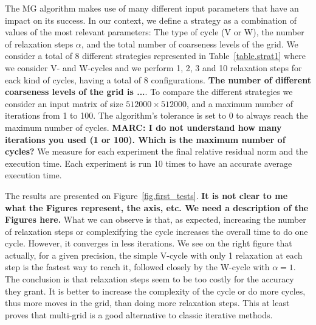 The MG algorithm makes use of many different input parameters that have an impact on its success. 
In our context, we define a strategy as a combination of values of the most relevant parameters: The type of cycle (V or W), the number of relaxation steps $\alpha$, and the total number of coarseness levels of the grid. 
We consider a total of 8 different strategies represented in Table~\ref{table.strat1} where we consider V- and W-cycles and we perform 1, 2, 3 and 10 relaxation steps for eack kind of cycles, having a total of 8 configurations. 
{\bf The number of different coarseness levels of the grid is ...}.
To compare the different strategies we consider an input matrix of size $512000 \times 512000$, 
and a maximum number of iterations from 1 to 100.
The algorithm's tolerance is set to $0$ to always reach the maximum number of cycles. 
{\bf MARC: I do not understand how many iterations you used (1 or 100). Which is the maximum number of cycles?}
We measure for each experiment the final relative residual norm and the execution time. 
Each experiment is run 10 times to have an accurate average execution time.

The results are presented on Figure~\ref{fig.first_tests}.
{\bf It is not clear to me what the Figures represent, the axis, etc. We need a description of the Figures here.}
What we can observe is that, as expected, increasing the number of relaxation steps or complexifying the cycle increases the overall time to do one cycle. However, it converges in less iterations.
We see on the right figure that actually, for a given precision, the simple V-cycle with only 1 relaxation at each step is the fastest way to reach it, followed closely by the W-cycle with $\alpha=1$.\\
The conclusion is that relaxation steps seem to be too costly for the accuracy they grant. It is better to increase the complexity of the cycle or do more cycles, thus more moves in the grid, than doing more relaxation steps. This at least proves
that multi-grid is a good alternative to classic iterative methods.
